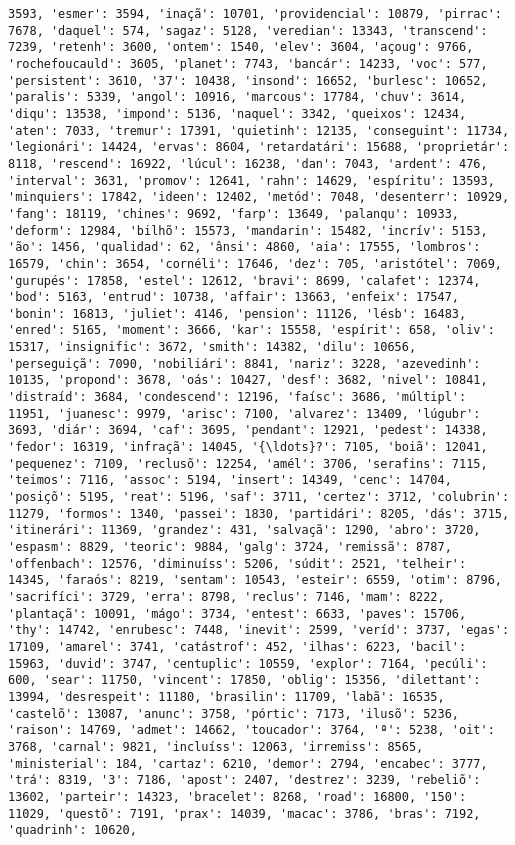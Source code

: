 \documentclass[11pt]{article}
\begin{document}
\begin{Verbatim}[commandchars=\\\{\}]
3593, 'esmer': 3594, 'inaçã': 10701, 'providencial': 10879, 'pirrac': 7678, 'daquel': 574, 'sagaz': 5128, 'veredian': 13343, 'transcend': 7239, 'retenh': 3600, 'ontem': 1540, 'elev': 3604, 'açoug': 9766, 'rochefoucauld': 3605, 'planet': 7743, 'bancár': 14233, 'voc': 577, 'persistent': 3610, '37': 10438, 'insond': 16652, 'burlesc': 10652, 'paralis': 5339, 'angol': 10916, 'marcous': 17784, 'chuv': 3614, 'diqu': 13538, 'impond': 5136, 'naquel': 3342, 'queixos': 12434, 'aten': 7033, 'tremur': 17391, 'quietinh': 12135, 'conseguint': 11734, 'legionári': 14424, 'ervas': 8604, 'retardatári': 15688, 'proprietár': 8118, 'rescend': 16922, 'lúcul': 16238, 'dan': 7043, 'ardent': 476, 'interval': 3631, 'promov': 12641, 'rahn': 14629, 'espíritu': 13593, 'minquiers': 17842, 'ideen': 12402, 'metód': 7048, 'desenterr': 10929, 'fang': 18119, 'chines': 9692, 'farp': 13649, 'palanqu': 10933, 'deform': 12984, 'bilhõ': 15573, 'mandarin': 15482, 'incrív': 5153, 'ão': 1456, 'qualidad': 62, 'ânsi': 4860, 'aia': 17555, 'lombros': 16579, 'chin': 3654, 'cornéli': 17646, 'dez': 705, 'aristótel': 7069, 'gurupés': 17858, 'estel': 12612, 'bravi': 8699, 'calafet': 12374, 'bod': 5163, 'entrud': 10738, 'affair': 13663, 'enfeix': 17547, 'bonin': 16813, 'juliet': 4146, 'pension': 11126, 'lésb': 16483, 'enred': 5165, 'moment': 3666, 'kar': 15558, 'espírit': 658, 'oliv': 15317, 'insignific': 3672, 'smith': 14382, 'dilu': 10656, 'perseguiçã': 7090, 'nobiliári': 8841, 'nariz': 3228, 'azevedinh': 10135, 'propond': 3678, 'oás': 10427, 'desf': 3682, 'nivel': 10841, 'distraíd': 3684, 'condescend': 12196, 'faísc': 3686, 'múltipl': 11951, 'juanesc': 9979, 'arisc': 7100, 'alvarez': 13409, 'lúgubr': 3693, 'diár': 3694, 'caf': 3695, 'pendant': 12921, 'pedest': 14338, 'fedor': 16319, 'infraçã': 14045, '{\ldots}?': 7105, 'boiã': 12041, 'pequenez': 7109, 'reclusõ': 12254, 'amél': 3706, 'serafins': 7115, 'teimos': 7116, 'assoc': 5194, 'insert': 14349, 'cenc': 14704, 'posiçõ': 5195, 'reat': 5196, 'saf': 3711, 'certez': 3712, 'colubrin': 11279, 'formos': 1340, 'passei': 1830, 'partidári': 8205, 'dás': 3715, 'itinerári': 11369, 'grandez': 431, 'salvaçã': 1290, 'abro': 3720, 'espasm': 8829, 'teoric': 9884, 'galg': 3724, 'remissã': 8787, 'offenbach': 12576, 'diminuíss': 5206, 'súdit': 2521, 'telheir': 14345, 'faraós': 8219, 'sentam': 10543, 'esteir': 6559, 'otim': 8796, 'sacrifíci': 3729, 'erra': 8798, 'reclus': 7146, 'mam': 8222, 'plantaçã': 10091, 'mágo': 3734, 'entest': 6633, 'paves': 15706, 'thy': 14742, 'enrubesc': 7448, 'inevit': 2599, 'veríd': 3737, 'egas': 17109, 'amarel': 3741, 'catástrof': 452, 'ilhas': 6223, 'bacil': 15963, 'duvid': 3747, 'centuplic': 10559, 'explor': 7164, 'pecúli': 600, 'sear': 11750, 'vincent': 17850, 'oblig': 15356, 'dilettant': 13994, 'desrespeit': 11180, 'brasilin': 11709, 'labã': 16535, 'castelõ': 13087, 'anunc': 3758, 'pórtic': 7173, 'ilusõ': 5236, 'raison': 14769, 'admet': 14662, 'toucador': 3764, 'ª': 5238, 'oit': 3768, 'carnal': 9821, 'incluíss': 12063, 'irremiss': 8565, 'ministerial': 184, 'cartaz': 6210, 'demor': 2794, 'encabec': 3777, 'trá': 8319, '3': 7186, 'apost': 2407, 'destrez': 3239, 'rebeliõ': 13602, 'parteir': 14323, 'bracelet': 8268, 'road': 16800, '150': 11029, 'questõ': 7191, 'prax': 14039, 'macac': 3786, 'bras': 7192, 'quadrinh': 10620, 
\end{Verbatim}
\end{document}
